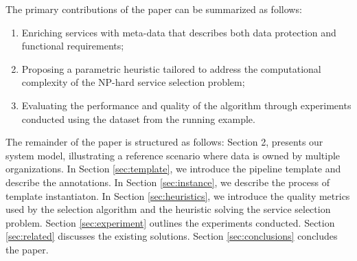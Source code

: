 The primary contributions of the paper can be summarized as follows:
\begin{enumerate}
  \item Enriching services with meta-data that describes both data protection and functional requirements;
  \item Proposing a parametric heuristic tailored to address the computational complexity of the NP-hard service selection problem;
  \item Evaluating the performance and quality of the algorithm through experiments conducted using the dataset from the running example.
\end{enumerate}
%
The remainder of the paper is structured as follows: Section 2, presents our system model, illustrating a reference scenario where data is owned by multiple organizations. In Section \ref{sec:template}, we introduce the pipeline template and describe the annotations. In Section \ref{sec:instance}, we describe the process of template instantiaton. In Section \ref{sec:heuristics}, we introduce the quality metrics used by the selection algorithm and the heuristic solving the service selection problem. Section \ref{sec:experiment} outlines the experiments conducted. Section \ref{sec:related} discusses the existing solutions. Section \ref{sec:conclusions} concludes the paper.